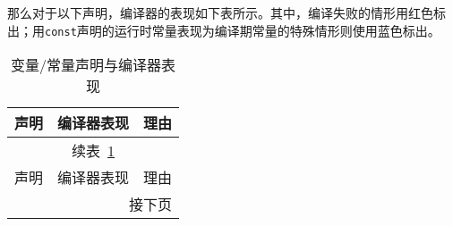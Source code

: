\documentclass[../main.tex]{subfiles}
\begin{document}
那么对于以下声明，编译器的表现如下表所示。其中，编译失败的情形用红色标出；用\texttt{const}声明的运行时常量表现为编译期常量的特殊情形则使用蓝色标出。
\begin{small}            %
\begin{longtable}[c]{l|ll}
  \caption{变量/常量声明与编译器表现}
  \label{tab:long}\\
  \toprule
  声明 & 编译器表现 & 理由 \\
  \midrule
  \endfirsthead          %

  \multicolumn{3}{c}{\footnotesize 续表~\ref{tab:long}}\\[.5ex]
  \toprule
  声明 & 编译器表现 & 理由 \\
  \midrule
  \endhead               %

  \midrule
  \multicolumn{3}{r}{\footnotesize 接下页}
  \endfoot               %

  \bottomrule
  \endlastfoot           %


\end{longtable}
\end{small}
\end{document}
